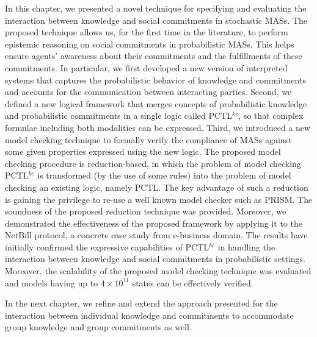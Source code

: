 In this chapter, we presented a novel technique for specifying and evaluating the interaction between knowledge and social commitments in stochastic MASs. The proposed technique allows us, for the first time in the literature, to perform epistemic reasoning on social commitments in probabilistic MASs. This helps ensure agents' awareness about their commitments and the fulfillments of these commitments. In particular, we first developed a new version of interpreted systems that captures the probabilistic behavior of knowledge and commitments and accounts for the communication between interacting parties. Second, we defined a new logical framework that merges concepts of probabilistic knowledge and probabilistic commitments in a single logic called PCTL$^{kc}$, so that complex formulae including both modalities
can be expressed. Third, we introduced a new model checking
technique to formally verify the compliance of MASs against some
given properties expressed using the new logic. The proposed model
checking procedure is reduction-based, in which the problem of
model checking PCTL$^{kc}$ is transformed (by the use of some rules) into the problem of model checking an existing logic, namely PCTL. The key advantage of such a reduction is gaining the privilege to re-use a well
known model checker such as PRISM. The soundness of the proposed
reduction technique was provided. Moreover, we demonstrated the
effectiveness of the proposed framework by applying it to the
NetBill protocol, a concrete case study from e-business domain.
The results have initially confirmed the expressive
capabilities of PCTL$^{kc}$ in handling the
interaction between knowledge and social commitments in
probabilistic settings. Moreover, the scalability of the proposed model
checking technique was evaluated and models having up to $4
\times 10^{11}$ states can be effectively verified.

In the next chapter, we refine and extend the approach presented for the interaction between individual knowledge and commitments to accommodate  group knowledge and group commitments as well.

